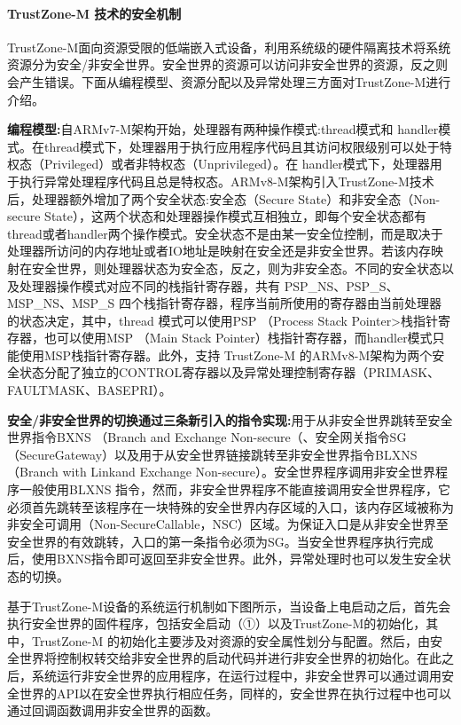 \documentclass[12pt,a4paper]{ctexart}
\begin{document}
\paragraph{TrustZone-M 技术的安全机制}
\par TrustZone-M面向资源受限的低端嵌入式设备，利用系统级的硬件隔离技术将系统资源分为安全/非安全世界。安全世界的资源可以访问非安全世界的资源，反之则会产生错误。下面从编程模型、资源分配以及异常处理三方面对TrustZone-M进行介绍。
\par \textbf{编程模型:}自ARMv7-M架构开始，处理器有两种操作模式:thread模式和 handler模式。在thread模式下，处理器用于执行应用程序代码且其访问权限级别可以处于特权态（Privileged）或者非特权态（Unprivileged）。在 handler模式下，处理器用于执行异常处理程序代码且总是特权态。ARMv8-M架构引入TrustZone-M技术后，处理器额外增加了两个安全状态:安全态（Secure State）和非安全态（Non-secure State），这两个状态和处理器操作模式互相独立，即每个安全状态都有thread或者handler两个操作模式。安全状态不是由某一安全位控制，而是取决于处理器所访问的内存地址或者IO地址是映射在安全还是非安全世界。若该内存映射在安全世界，则处理器状态为安全态，反之，则为非安全态。不同的安全状态以及处理器操作模式对应不同的栈指针寄存器，共有 PSP\_NS、PSP\_S、MSP\_NS、MSP\_S 四个栈指针寄存器，程序当前所使用的寄存器由当前处理器的状态决定，其中，thread 模式可以使用PSP （Process Stack Pointer>栈指针寄存器，也可以使用MSP （Main Stack Pointer）栈指针寄存器，而handler模式只能使用MSP栈指针寄存器。此外，支持 TrustZone-M 的ARMv8-M架构为两个安全状态分配了独立的CONTROL寄存器以及异常处理控制寄存器（PRIMASK、FAULTMASK、BASEPRI）。
\par \textbf{安全/非安全世界的切换通过三条新引入的指令实现:}用于从非安全世界跳转至安全世界指令BXNS （Branch and Exchange Non-secure（、安全网关指令SG （SecureGateway）以及用于从安全世界链接跳转至非安全世界指令BLXNS （Branch with Linkand Exchange Non-secure）。安全世界程序调用非安全世界程序一般使用BLXNS 指令，然而，非安全世界程序不能直接调用安全世界程序，它必须首先跳转至该程序在一块特殊的安全世界内存区域的入口，该内存区域被称为非安全可调用（Non-SecureCallable，NSC）区域。为保证入口是从非安全世界至安全世界的有效跳转，入口的第一条指令必须为SG。当安全世界程序执行完成后，使用BXNS指令即可返回至非安全世界。此外，异常处理时也可以发生安全状态的切换。
\par 基于TrustZone-M设备的系统运行机制如下图所示，当设备上电启动之后，首先会执行安全世界的固件程序，包括安全启动（①）以及TrustZone-M的初始化，其中，TrustZone-M 的初始化主要涉及对资源的安全属性划分与配置。然后，由安全世界将控制权转交给非安全世界的启动代码并进行非安全世界的初始化。在此之后，系统运行非安全世界的应用程序，在运行过程中，非安全世界可以通过调用安全世界的API以在安全世界执行相应任务，同样的，安全世界在执行过程中也可以通过回调函数调用非安全世界的函数。
\end{document}
